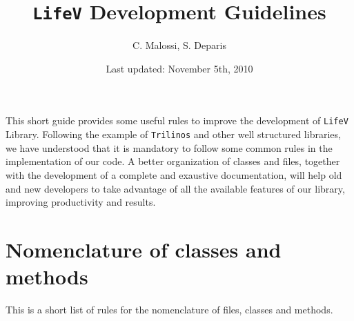 \documentclass[a4paper]{article}
\title{\texttt{LifeV} Development Guidelines}
\author{C. Malossi, S. Deparis}
\date{Last updated: November 5th, 2010}
\begin{document}
\maketitle

This short guide provides some useful rules to improve the development of \texttt{LifeV} Library. Following the example of \texttt{Trilinos} and other well structured libraries, we have understood that it is mandatory to follow some common rules in the implementation of our code. A better organization of classes and files, together with the development of a complete and exaustive documentation, will help old and new developers to take advantage of all the available features of our library, improving productivity and results.

\section{Nomenclature of classes and methods}
This is a short list of rules for the nomenclature of files, classes and methods.
\end{document}
